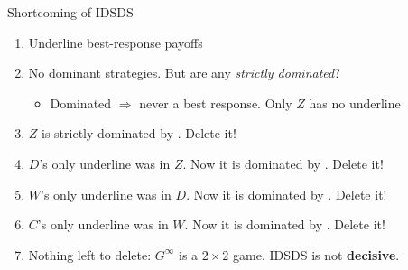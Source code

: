 \begin{frame}{Shortcoming of IDSDS}
\begin{center}
\begin{matrixgame}[top={W, X, Y, Z}, left={A, B, C, D}, player names={Player 1, Player 2},
                   w=1.4, h=0.65, br=<2->]
\end{matrixgame}
\end{center}
\small
\begin{enumerate}
    \item Underline best-response payoffs
    \item<2-> No dominant strategies. But are any \textit{strictly dominated}?
    \begin{itemize}
        \item<2-> Dominated $\Rightarrow$ never a best response. Only $Z$ has no underline
    \end{itemize}
    \item<2-> $Z$ is strictly dominated by \underline{\hspace{0.4in}}. Delete it!
    \item<3-> $D$'s only underline was in $Z$. Now it is dominated by \underline{\hspace{0.4in}}. Delete it!
    \item<4-> $W$'s only underline was in $D$. Now it is dominated by \underline{\hspace{0.4in}}. Delete it!
    \item<5-> $C$'s only underline was in $W$. Now it is dominated by \underline{\hspace{0.4in}}. Delete it!
    \item<6-> Nothing left to delete: $G^\infty$ is a $2\times 2$ game. IDSDS is not \textbf{decisive}.
\end{enumerate}
\vspace{-0.3in}
\end{frame}

